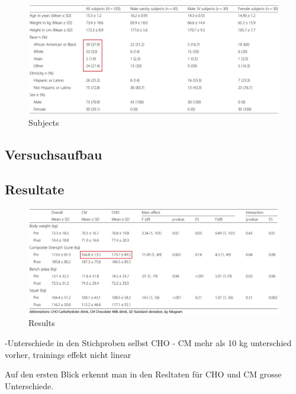 \documentclass[
]{article}
\begin{document}
\begin{figure}

{\centering \includegraphics[width=1\linewidth]{subjects} 

}

\caption{Subjects}\label{fig:subjects}
\end{figure}

\hypertarget{versuchsaufbau}{%
\subsection{Versuchsaufbau}\label{versuchsaufbau}}

\hypertarget{resultate}{%
\subsection{Resultate}\label{resultate}}

\begin{figure}

{\centering \includegraphics[width=1\linewidth]{results} 

}

\caption{Results}\label{fig:results}
\end{figure}

-Unterschiede in den Stichproben selbst CHO - CM mehr als 10 kg
unterschied vorher, trainings effekt nicht linear

Auf den ersten Blick erkennt man in den Resltaten für CHO und CM grosse
Unterschiede.
\end{document}
